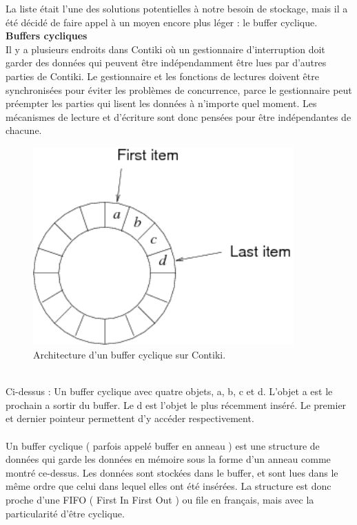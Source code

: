 				La liste était l'une des solutions potentielles à notre besoin de stockage, mais il a été décidé de faire appel à un moyen encore plus léger : le buffer cyclique.
			\clearpage
			\textbf{Buffers cycliques}\\
				Il y a plusieurs endroits dans Contiki où un gestionnaire d'interruption doit garder des données qui peuvent être indépendamment être lues par d'autres parties de Contiki. Le gestionnaire et les fonctions de lectures doivent être synchronisées pour éviter les problèmes de concurrence, parce le gestionnaire peut préempter les parties qui lisent les données à n'importe quel moment. Les mécanismes de lecture et d'écriture sont donc pensées pour être indépendantes de chacune.\\
				\begin{figure}[htp]
					\centering
					\includegraphics[width=10cm]{images/ringbuf}
					\caption{Architecture d'un buffer cyclique sur Contiki.}
					\label{fig:ringbuf}
				\end{figure}\\
				Ci-dessus : Un buffer cyclique avec quatre objets, a, b, c et d. L'objet a est le prochain a sortir du buffer. Le d est l'objet le plus récemment inséré. Le premier et dernier pointeur permettent d'y accéder respectivement.\\\\
				Un buffer cyclique ( parfois appelé buffer en anneau ) est une structure de données qui garde les données en mémoire sous la forme d'un anneau comme montré ce-dessus. Les données sont stockées dans le buffer, et sont lues dans le même ordre que celui dans lequel elles ont été insérées. La structure est donc proche d'une FIFO ( First In First Out ) ou file en français, mais avec la particularité d'être cyclique.\\
